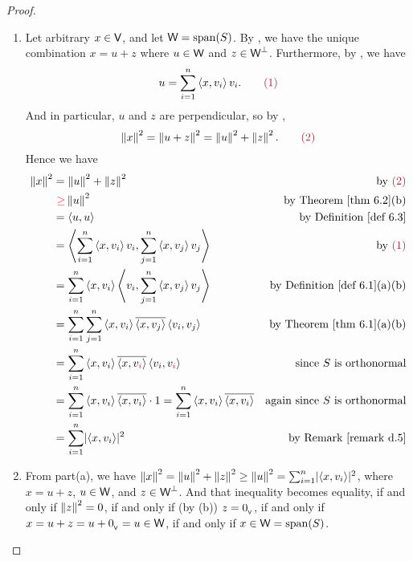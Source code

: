\begin{proof} \ 

\begin{enumerate}
\item Let arbitrary \(x \in \textsf{V}\), and let \(\textsf{W} = \operatorname{span}(S)\).
By , we have the unique combination \(x = u + z\) where \(u \in \textsf{W}\) and \(z \in \textsf{W}^{\perp}\).
Furthermore, by , we have
\[
    u = \sum_{i = 1}^n \LG x, v_i \RG v_i. \quad \quad \MAROON{(1)}
\]
And in particular, \(u\) and \(z\) are perpendicular, so by ,
\[
    \norm{x}^2 = \norm{u + z}^2 = \norm{u}^2 + \norm{z}^2. \quad \quad \MAROON{(2)}
\]
Hence we have
\begin{align*}
    \norm{x}^2 & = \norm{u}^2 + \norm{z}^2 & \text{by \MAROON{(2)}} \\
    & \ \RED{\ge} \norm{u}^2 & \text{by \THM{6.2}(b)} \\
    & = \LG u, u \RG & \text{by \DEF{6.3}} \\
    & = \LG \sum_{i = 1}^n \LG x, v_i \RG v_i, \sum_{j = 1}^n \LG x, v_j \RG v_j \RG & \text{by \MAROON{(1)}} \\
    & = \sum_{i = 1}^n \LG x, v_i \RG \LG v_i, \sum_{j = 1}^n \LG x, v_j \RG v_j \RG & \text{by \DEF{6.1}(a)(b)} \\
    & = \sum_{i = 1}^n \sum_{j = 1}^n \LG x, v_i \RG \conjugatet{\LG x, v_j \RG} \LG v_i, v_j \RG & \text{by \THM{6.1}(a)(b)} \\
    & = \sum_{i = 1}^n \LG x, v_i \RG \conjugatet{\LG x, v_{\RED{i}} \RG} \LG v_i, v_{\RED{i}} \RG & \text{since \(S\) is orthonormal} \\
    & = \sum_{i = 1}^n \LG x, v_i \RG \conjugatet{\LG x, v_i \RG} \cdot 1 = \sum_{i = 1}^n \LG x, v_i \RG \conjugatet{\LG x, v_i \RG} & \text{again since \(S\) is orthonormal} \\
    & = \sum_{i = 1}^n \abs{\LG x, v_i \RG}^2 & \text{by \RMK{d.5}}
\end{align*}

\item
From part(a), we have \(\left\lVert x\right\rVert^2 = \left\lVert u\right\rVert^2 + \left\lVert z\right\rVert^2 \ge \left\lVert u\right\rVert^2 = \sum_{i = 1}^n \lvert\left< x, v_i \right>\rvert^2\), where \(x = u + z\), \(u \in \textsf{W}\), and \(z \in \textsf{W}^{\perp}\).
And that inequality becomes equality, if and only if \(\left\lVert z\right\rVert^2 = 0\), if and only if (by (b)) \(z = 0_{_{\textsf{V}}}\), if and only if \(x = u + z = u + 0_{_{\textsf{V}}} = u \in \textsf{W}\), if and only if \(x \in \textsf{W} = \operatorname{span}(S)\).
\end{enumerate}
\end{proof}

